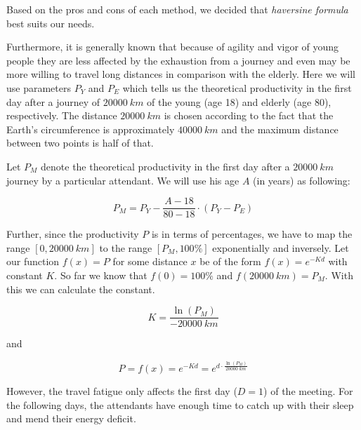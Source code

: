 Based on the pros and cons of each method, we decided that \emph{haversine formula} best suits our needs.

Furthermore, it is generally known that because of agility and vigor of young people they are less affected by the exhaustion from a journey and even may be more willing to travel long distances in comparison with the elderly. Here we will use parameters $P_Y$ and $P_E$ which tells us the theoretical productivity in the first day after a journey of $\SI{20000}{km}$ of the young (age 18) and elderly (age 80), respectively. The distance $\SI{20000}{km}$ is chosen according to the fact that the Earth's circumference is approximately $\SI{40000}{km}$ and the maximum distance between two points is half of that.

Let $P_M$ denote the theoretical productivity in the first day after a $\SI{20000}{km}$ journey by a particular attendant. We will use his age $A$ (in years) as following:

$$P_M = P_Y - \frac{A - 18}{80 - 18} \cdot (P_Y - P_E) $$

Further, since the productivity $P$ is in terms of percentages, we have to map the range $\left[ 0, \SI{20000}{km} \right]$ to the range $\left[ P_M, 100\% \right]$ exponentially and inversely. Let our function $f(x) = P$ for some distance $x$ be of the form $f(x) = e^{-Kd}$ with constant $K$. So far we know that $f(0) = 100\%$ and $f(\SI{20000}{km})=P_M$. With this we can calculate the constant.

$$K = \frac{\ln(P_M)}{-\SI{20000}{km}}$$

\noindent and

$$P = f(x) = e^{-Kd} = e^{d \cdot \frac{\ln(P_M)}{\SI{20000}{km}}}$$

However, the travel fatigue only affects the first day ($D=1$) of the meeting. For the following days, the attendants have enough time to catch up with their sleep and mend their energy deficit.
